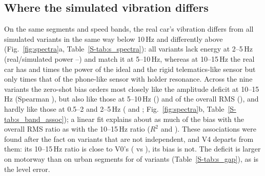\subsection{Where the simulated vibration differs}
\label{sec:res_mech}

On the same segments and speed bands, the real car's vibration differs from all simulated variants in the same way below 10\,Hz and differently above (Fig.~\ref{fig:spectra}a, Table~\ref{S-tab:s_spectra}): all variants lack energy at 2--5\,Hz (real/simulated power \spVoneMidPow--\spVfiveMidPow) and match it at 5--10\,Hz, whereas at 10--15\,Hz the real car has \spVthreeHighPow{} and \spVoneHighPow{} times the power of the ideal and the rigid telematics-like sensor but only \spVtwoHighPow{} times that of the phone-like sensor with holder resonance.
Across the nine variants the zero-shot bias orders most closely like the amplitude deficit at 10--15\,Hz (Spearman \baSpHighBias), but also like those at 5--10\,Hz (\baSpMidHighBias) and of the overall RMS (\baSpRmsBias), and hardly like those at 0.5--2 and 2--5\,Hz (\baSpLowBias{} and \baSpMidBias; Fig.~\ref{fig:spectra}b, Table~\ref{S-tab:s_band_assoc}); a linear fit explains about as much of the bias with the overall RMS ratio as with the 10--15\,Hz ratio ($R^2$ \baRtwoRmsBias{} and \baRtwoHighBias).
These associations were found after the fact on variants that are not independent, and V4 departs from them: its 10--15\,Hz ratio is close to V0's (\vpVfourRatioHigh{} vs \vpVzeroRatioHigh), its bias is not.
The deficit is larger on motorway than on urban segments for \bgcMotorwayLarger{} of \bgcNvar{} variants (Table~\ref{S-tab:s_gap}), as is the level error.

